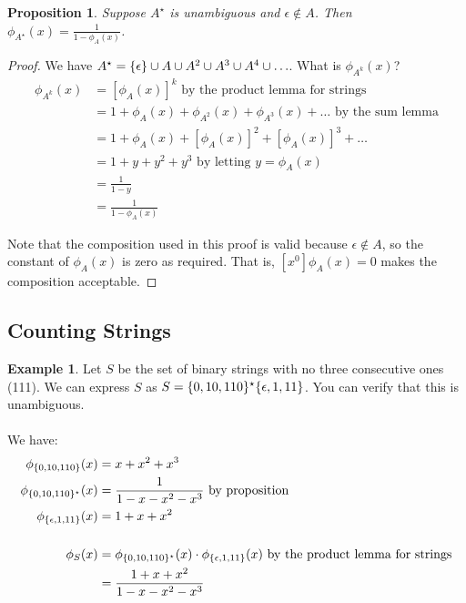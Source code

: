 \documentclass[]{article}
\newtheorem*{proposition}{Proposition}
\theoremstyle{definition}
\newtheorem{ex}{Example}[section]
\newcommand{\lecture}[1]{\marginpar{{\footnotesize $\leftarrow$ \underline{#1}}}}
\DeclarePairedDelimiter{\set}{\lbrace}{\rbrace}
\begin{document}
			\begin{proposition}
				Suppose $A^\star$ is unambiguous and $\epsilon \not \in A$. Then $\phi_{A^\star}(x) = \frac{1}{1 - \phi_A(x)}$.
				\label{proposition:unambiguousstar}
			\end{proposition}

			\begin{proof}
				We have $A^\star = \set{\epsilon} \cup A \cup A^2 \cup A^3 \cup A^4 \cup \ldots$. What is $\phi_{A^k}(x)$?
				\begin{align*}
					\phi_{A^k}(x) &= [\phi_A(x)]^k \text{ by the product lemma for strings} \\
					&= 1 + \phi_A(x) + \phi_{A^2}(x) + \phi_{A^3}(x) + \ldots \text{ by the sum lemma} \\
					&= 1 + \phi_A(x) + [\phi_A(x)]^2 + [\phi_A(x)]^3 + \ldots \\
					&= 1 + y + y^2 + y^3 \text{ by letting } y = \phi_A(x) \\
					&= \frac{1}{1 - y} \\
					&= \frac{1}{1 - \phi_A(x)}
				\end{align*}

				Note that the composition used in this proof is valid because $\epsilon \not \in A$, so the constant of $\phi_A(x)$ is zero as required. That is, $[x^0]\phi_A(x) = 0$ makes the composition acceptable.
			\end{proof}
		\subsection{Counting Strings} \lecture{January 30, 2013}
			\begin{ex}
				Let $S$ be the set of binary strings with no three consecutive ones (111). We can express $S$ as $S = \set{0, 10, 110 }^\star \set{\epsilon, 1, 11}$. You can verify that this is unambiguous.
				\\ \\
				We have:
				\begin{align*}
					\phi_{\set{0, 10, 110}}(x) &= x + x^2 + x^3 \\
					\phi_{\set{0, 10, 110}^\star}(x) &= \frac{1}{1 - x - x^2 - x^3} \text{ by proposition} \\
					\phi_{\set{\epsilon, 1, 11}}(x) &= 1 + x + x^2 \\ \\
					\phi_S(x) &= \phi_{\set{0, 10, 110}^\star}(x) \cdot \phi_{\set{\epsilon, 1, 11}}(x) \text{ by the product lemma for strings} \\
					&= \frac{1 + x + x^2}{1 - x - x^2 - x^3}
				\end{align*}
			\end{ex}
\end{document}
